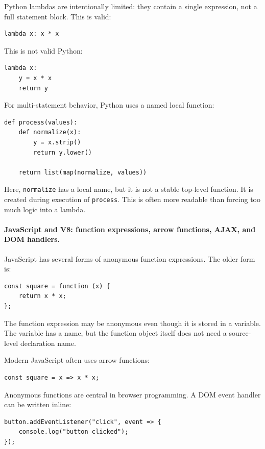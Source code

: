 \documentclass[a4paper,twoside]{report}
\begin{document}
Python lambdas are intentionally limited: they contain a single expression, not a full statement block. This is valid:

\begin{verbatim}
lambda x: x * x
\end{verbatim}

This is not valid Python:

\begin{verbatim}
lambda x:
    y = x * x
    return y
\end{verbatim}

For multi-statement behavior, Python uses a named local function:

\begin{verbatim}
def process(values):
    def normalize(x):
        y = x.strip()
        return y.lower()

    return list(map(normalize, values))
\end{verbatim}

Here, \texttt{normalize} has a local name, but it is not a stable top-level function. It is created during execution of \texttt{process}. This is often more readable than forcing too much logic into a lambda.

\paragraph{JavaScript and V8: function expressions, arrow functions, AJAX, and DOM handlers.}

JavaScript has several forms of anonymous function expressions. The older form is:

\begin{verbatim}
const square = function (x) {
    return x * x;
};
\end{verbatim}

The function expression may be anonymous even though it is stored in a variable. The variable has a name, but the function object itself does not need a source-level declaration name.

Modern JavaScript often uses arrow functions:

\begin{verbatim}
const square = x => x * x;
\end{verbatim}

Anonymous functions are central in browser programming. A DOM event handler can be written inline:

\begin{verbatim}
button.addEventListener("click", event => {
    console.log("button clicked");
});
\end{verbatim}
\end{document}
